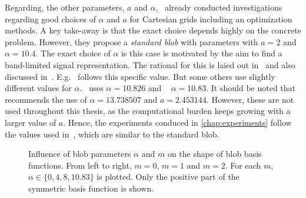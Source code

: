 Regarding, the other parameters, \(a\) and \(\alpha\),~\cite{matej_practical_1996} already conducted
investigations regarding good choices of \(\alpha\) and \(a\) for Cartesian grids including an
optimization methods. A key take-away is that the exact choice depends highly on the concrete
problem. However, they propose a \textit{standard blob} with parameters with \(a = 2\) and \(\alpha
= 10.4\). The exact choice of \(\alpha\) is this case is motivated by the aim to find a band-limited
signal representation. The rational for this is laied out in~\cite{lewitt_multidimensional_1990} and
also discussed in~\cite{benkarroum_blob_2015}. E.g.~\cite{xu_investigation_2012} follows this
specific value. But some others use slightly different values for
\(\alpha\).~\cite{kohler_iterative_2011} uses \(\alpha = 10.826\) and
~\cite{levakhina_three-dimensional_2014} \(\alpha = 10.83\). It should be noted
that~\cite{benkarroum_blob_2015} recommends the use of \(\alpha = 13.738507\) and \(a = 2.453144\).
However, these are not used throughout this thesis, as the computational burden keeps growing with a
larger value of \(a\). Hence, the experiments conduced in \autoref{chap:experiments} follow the
values used in~\cite{levakhina_three-dimensional_2014}, which are similar to the standard blob.

\begin{figure}
	\centering
	\caption{Influence of blob parameters \(\alpha\) and \(m\) on the shape of blob basis
		functions. From left to right, \(m = 0\), \(m = 1\) and \(m = 2\). For each \(m\),
		\(\alpha \in \lbrace 0, 4, 8, 10.83 \rbrace\) is plotted. Only the positive part of
		the symmetric basis function is shown.
	}\label{fig:blob_parameter_overview}
\end{figure}

